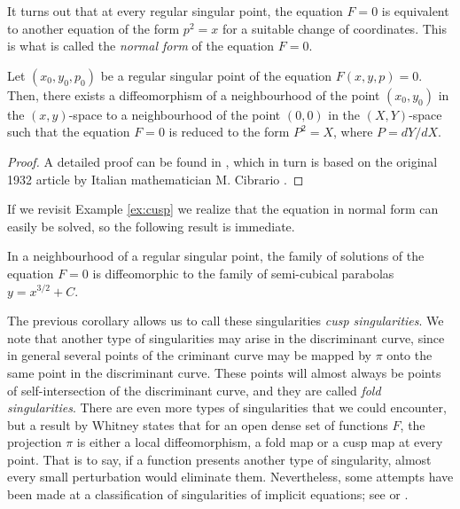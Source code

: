 It turns out that at every regular singular point, the equation $F=0$ is equivalent to another equation of the form $p^2=x$ for a suitable change of coordinates. This is what is called the \textit{normal form} of the equation $F=0$.

\begin{theorem} Let $(x_0,y_0,p_0)$ be a regular singular point of the equation $F(x,y,p)=0$. Then, there exists a diffeomorphism of a neighbourhood of the point $(x_0,y_0)$ in the $(x,y)$-space to a neighbourhood of the point $(0,0)$ in the $(X,Y)$-space such that the equation $F=0$ is reduced to the form $P^2=X$, where $P=dY/dX$.

\end{theorem}

\begin{proof}
  A detailed proof can be found in \cite[27]{arnold2012geometrical}, which in turn is based on the original 1932 article by Italian mathematician M. Cibrario \cite{cibrario1932reduzione}.
\end{proof}
If we revisit Example \ref{ex:cusp} we realize that the equation in normal form can easily be solved, so the following result is immediate.

\begin{corollary} In a neighbourhood of a regular singular point, the family of solutions of the equation $F=0$ is diffeomorphic to the family of semi-cubical parabolas $y=x^{3/2}+C$.

\end{corollary}

The previous corollary allows us to call these singularities \textit{cusp singularities}. We note that another type of singularities may arise in the discriminant curve, since in general several points of the criminant curve may be mapped by $\pi$ onto the same point in the discriminant curve. These points will almost always be points of self-intersection of the discriminant curve, and they are called \textit{fold singularities}. There are even more types of singularities that we could encounter, but a result by Whitney \cite{whitney1955singularities} states that for an open dense set of functions $F$, the projection $\pi$ is either a local diffeomorphism, a fold map or a cusp map at every point. That is to say, if a function presents another type of singularity, almost every small perturbation would eliminate them. Nevertheless, some attempts have been made at a classification of singularities of implicit equations; see \cite{chertovskih2014pleated} or \cite{dara1975singularites}.


